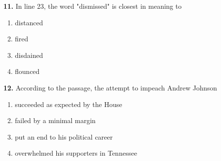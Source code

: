 \documentclass[12pt]{article}
\begin{document}
\noindent\textbf{11.} In line 23, the word "dismissed" is closest in meaning to
\begin{enumerate}[label=(\Alph*),leftmargin=*,itemsep=0.2em]
\item distanced
\item fired
\item disdained
\item flounced
\end{enumerate}
\par
\vspace{0.25\baselineskip}
\noindent\textbf{12.} According to the passage, the attempt to impeach Andrew Johnson
\begin{enumerate}[label=(\Alph*),leftmargin=*,itemsep=0.2em]
\item succeeded as expected by the House
\item failed by a minimal margin
\item put an end to his political career
\item overwhelmed his supporters in Tennessee
\end{enumerate}
\par
\vspace{0.25\baselineskip}
\end{document}
